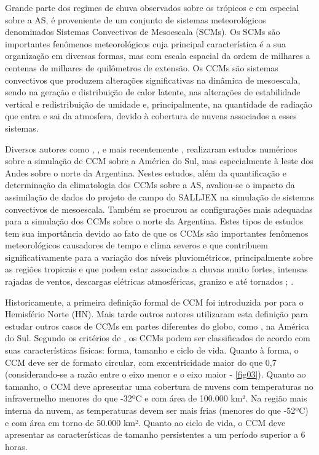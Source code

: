 Grande parte dos regimes de chuva observados sobre os trópicos e em especial sobre a AS, é proveniente de um conjunto de sistemas meteorológicos denominados Sistemas Convectivos de Mesoescala (SCMs). Os SCMs são importantes fenômenos meteorológicos  cuja principal característica é a sua organização em diversas formas, mas com escala espacial da ordem de milhares a centenas de milhares de quilômetros de extensão. Os CCMs são sistemas convectivos que produzem alterações significativas na dinâmica de mesoescala, sendo na geração e distribuição de calor latente, nas alterações de estabilidade vertical e redistribuição de umidade e, principalmente, na quantidade de radiação que entra e sai da atmosfera, devido à cobertura de nuvens associados a esses sistemas.

Diversos autores como , ,  e mais recentemente , realizaram estudos numéricos sobre a simulação de CCM sobre a América do Sul, mas especialmente à leste dos Andes sobre o norte da Argentina. Nestes estudos, além da quantificação e determinação da climatologia dos CCMs sobre a AS, avaliou-se o impacto da assimilação de dados do projeto de campo do SALLJEX na simulação de sistemas convectivos de mesoescala. Também  se procurou as configurações mais adequadas para a simulação dos CCMs sobre o norte da Argentina. Estes tipos de estudos tem sua importância devido ao fato de que os CCMs são importantes fenômenos meteorológicos causadores de tempo e clima severos e que contribuem significativamente para a variação dos níveis pluviométricos, principalmente sobre as regiões tropicais e que podem estar associados a chuvas muito fortes, intensas rajadas de ventos, descargas elétricas atmosféricas, granizo e até tornados \cite{maddox80}; \cite{menezessilvadias04}.

Historicamente, a primeira definição formal de CCM foi introduzida por  para o Hemisfério Norte (HN). Mais tarde outros autores utilizaram esta definição para estudar outros casos de CCMs em partes diferentes do globo, como , na América do Sul. Segundo os critérios de , os CCMs podem ser classificados de acordo com suas características físicas: forma, tamanho e ciclo de vida. Quanto à forma, o CCM deve ser de formato circular, com excentricidade maior do que 0,7 (considerando-se a razão entre o eixo menor e o eixo maior - \autoref{fig03}). Quanto ao tamanho, o CCM deve apresentar uma cobertura de nuvens com temperaturas no infravermelho menores do que -32ºC e com área de 100.000 km². Na região mais interna da nuvem, as temperaturas devem ser mais frias (menores do que -52ºC) e com área em torno de 50.000 km². Quanto ao ciclo de vida, o CCM deve apresentar as características de tamanho persistentes a um período superior a 6 horas.

